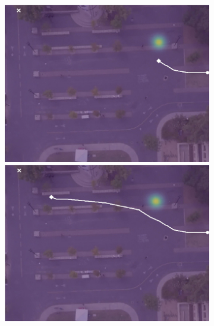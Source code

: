 \documentclass[letterpaper,10pt,conference]{ieeeconf}
\begin{document}
\begin{figure}[t!]
\begin{subfigure}[t]{0.48\textwidth}
	\vspace{0.1cm}
		\begin{minipage}[c]{0.47cm}
		\end{minipage}
		\begin{minipage}[c]{0.3\linewidth}
			\includegraphics[width=\linewidth]{./figures/bookstore/lstm_1_2_t=100.jpg}
		\end{minipage}
		\begin{minipage}[c]{0.3\linewidth}
			\includegraphics[width=\linewidth]{./figures/bookstore/lstm_1_2_t=300.jpg}
		\end{minipage}
		\begin{minipage}[c]{0.3\linewidth}

\end{minipage}
\end{subfigure}
\end{figure}
\end{document}
